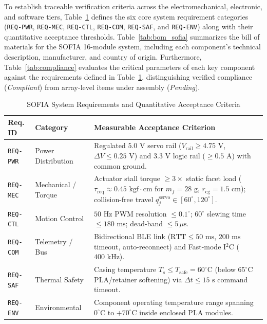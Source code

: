 \documentclass[lettersize,journal]{IEEEtran}
\begin{document}
	To establish traceable verification criteria across the electromechanical, electronic, and software tiers, Table~\ref{tab:system_requirements} defines the six core system requirement categories (\texttt{REQ-PWR}, \texttt{REQ-MEC}, \texttt{REQ-CTL}, \texttt{REQ-COM}, \texttt{REQ-SAF}, and \texttt{REQ-ENV}) along with their quantitative acceptance thresholds. Table~\ref{tab:bom_sofia} summarizes the bill of materials for the SOFIA 16-module system, including each component's technical description, manufacturer, and country of origin. Furthermore, Table~\ref{tab:compliance} evaluates the critical parameters of each key component against the requirements defined in Table~\ref{tab:system_requirements}, distinguishing verified compliance (\textit{Compliant}) from array-level items under assembly (\textit{Pending}).
	
	\begin{table}[!t]
		\centering
		\caption{SOFIA System Requirements and Quantitative Acceptance Criteria}
		\label{tab:system_requirements}
		\scriptsize
		\setlength{\tabcolsep}{3pt}
		\renewcommand{\arraystretch}{0.88}
		\begin{tabular}{@{}l p{2.3cm} p{4.6cm}@{}}
			\toprule
			\textbf{Req. ID} & \textbf{Category} & \textbf{Measurable Acceptance Criterion} \\
			\midrule
			\texttt{REQ-PWR} & Power Distribution & Regulated $5.0\text{ V}$ servo rail ($V_{\text{rail}} \ge 4.75\text{ V}$, $\Delta V \le 0.25\text{ V}$) and $3.3\text{ V}$ logic rail ($\ge 0.5\text{ A}$) with common ground. \\
			\texttt{REQ-MEC} & Mechanical / Torque & Actuator stall torque $\ge 3\times$ static facet load ($\tau_{\text{req}} \approx 0.45\text{ kgf}\cdot\text{cm}$ for $m_f = 28\text{ g}$, $r_{\text{cg}} = 1.5\text{ cm}$); collision-free travel $q_j^{\text{servo}} \in [60^\circ, 120^\circ]$. \\
			\texttt{REQ-CTL} & Motion Control & $50\text{ Hz}$ PWM resolution $\le 0.1^\circ$; $60^\circ$ slewing time $\le 180\text{ ms}$; dead-band $\le 5\,\mu\text{s}$. \\
			\texttt{REQ-COM} & Telemetry / Bus & Bidirectional BLE link ($\text{RTT} \le 50\text{ ms}$, $200\text{ ms}$ timeout, auto-reconnect) and Fast-mode I$^2$C ($400\text{ kHz}$). \\
			\texttt{REQ-SAF} & Thermal Safety & Casing temperature $T_s \le T_{\text{safe}} = 60^\circ\text{C}$ (below $65^\circ\text{C}$ PLA/retainer softening) via $\Delta t \le 15\text{ s}$ command timeout. \\
			\texttt{REQ-ENV} & Environmental & Component operating temperature range spanning $0^\circ\text{C}$ to $+70^\circ\text{C}$ inside enclosed PLA modules. \\
			\bottomrule
		\end{tabular}
	\end{table}
	
\end{document}
